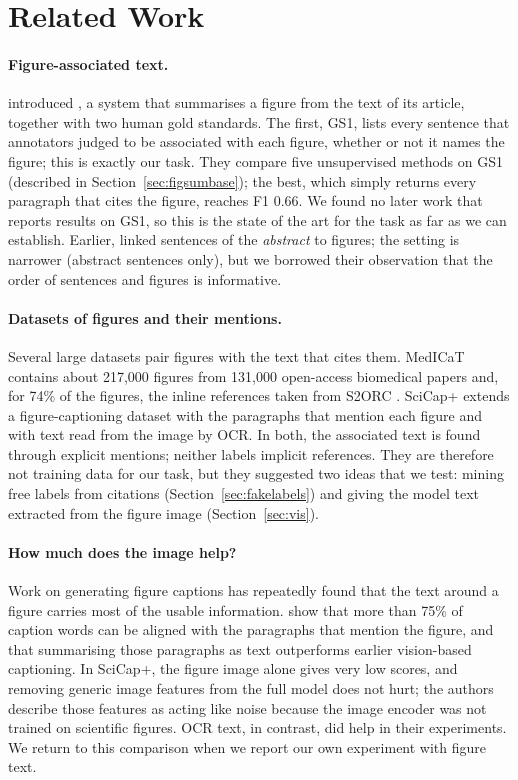\section{Related Work}
\label{sec:related}

\paragraph{Figure-associated text.} \citet{ramesh2015figsum} introduced \figsum{}, a system that summarises a
figure from the text of its article, together with two human gold standards. The first, GS1, lists every
sentence that annotators judged to be associated with each figure, whether or not it names the figure; this is
exactly our task. They compare five unsupervised methods on GS1 (described in Section~\ref{sec:figsumbase});
the best, which simply returns every paragraph that cites the figure, reaches F1 0.66. We found no later work
that reports results on GS1, so this is the state of the art for the task as far as we can establish.
Earlier, \citet{bockhorst2012beyond} linked sentences of the \emph{abstract} to figures; the setting is
narrower (abstract sentences only), but we borrowed their observation that the order of sentences and figures
is informative.

\paragraph{Datasets of figures and their mentions.} Several large datasets pair figures with the text that
cites them. MedICaT \citep{subramanian2020medicat} contains about 217,000 figures from 131,000 open-access
biomedical papers and, for 74\% of the figures, the inline references taken from S2ORC \citep{lo2020s2orc}.
SciCap+ \citep{yang2023scicapplus} extends a figure-captioning dataset with the paragraphs that mention each
figure and with text read from the image by OCR. In both, the associated text is found through explicit
mentions; neither labels implicit references. They are therefore not training data for our task, but they
suggested two ideas that we test: mining free labels from citations (Section~\ref{sec:fakelabels}) and giving
the model text extracted from the figure image (Section~\ref{sec:vis}).

\paragraph{How much does the image help?} Work on generating figure captions has repeatedly found that the
text around a figure carries most of the usable information. \citet{huang2023summaries} show that more than 75\% of
caption words can be aligned with the paragraphs that mention the figure, and that summarising those paragraphs
as text outperforms earlier vision-based captioning. In SciCap+, the figure image alone gives very low scores,
and removing generic image features from the full model does not hurt; the authors describe those features as
acting like noise because the image encoder was not trained on scientific figures. OCR text, in contrast, did
help in their experiments. We return to this comparison when we report our own experiment with figure text.

